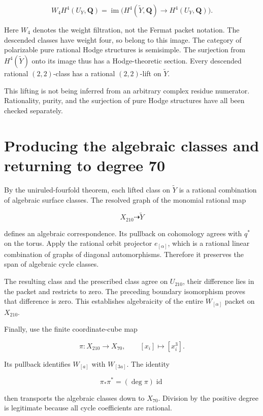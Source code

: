 \[
W_4H^4(U_Y,\mathbf Q)
=\operatorname{im}\bigl(H^4(\widetilde Y,\mathbf Q)
\to H^4(U_Y,\mathbf Q)\bigr).
\]

Here \(W_4\) denotes the weight filtration, not the Fermat packet
notation. The descended classes have weight four, so belong to this
image. The category of polarizable pure rational Hodge structures is
semisimple. The surjection from \(H^4(\widetilde Y)\) onto its image
thus has a Hodge-theoretic section. Every descended rational
\((2,2)\)-class has a rational \((2,2)\)-lift on \(\widetilde Y\).

This lifting is not being inferred from an arbitrary complex residue
numerator. Rationality, purity, and the surjection of pure Hodge
structures have all been checked separately.

\hypertarget{carrier70-producing-the-algebraic-classes-and-returning-to-degree-70}{%
\section{Producing the algebraic classes and returning to degree
70}\label{carrier70-producing-the-algebraic-classes-and-returning-to-degree-70}}

By the uniruled-fourfold theorem, each lifted class on \(\widetilde Y\)
is a rational combination of algebraic surface classes. The resolved
graph of the monomial rational map

\[
X_{210}\dashrightarrow\widetilde Y
\]

defines an algebraic correspondence. Its pullback on cohomology agrees
with \(q^*\) on the torus. Apply the rational orbit projector
\(e_{[\alpha]}\), which is a rational linear combination of graphs of
diagonal automorphisms. Therefore it preserves the span of algebraic
cycle classes.

The resulting class and the prescribed class agree on \(U_{210}\), their
difference lies in the packet and restricts to zero. The preceding
boundary isomorphism proves that difference is zero. This establishes
algebraicity of the entire \(W_{[\alpha]}\) packet on \(X_{210}\).

Finally, use the finite coordinate-cube map

\[
\pi:X_{210}\longrightarrow X_{70},\qquad
[x_i]\longmapsto[x_i^3].
\]

Its pullback identifies \(W_{[a]}\) with \(W_{[3a]}\). The identity

\[
\pi_*\pi^*=(\deg\pi)\operatorname{id}
\]

then transports the algebraic classes down to \(X_{70}\). Division by
the positive degree is legitimate because all cycle coefficients are
rational.


